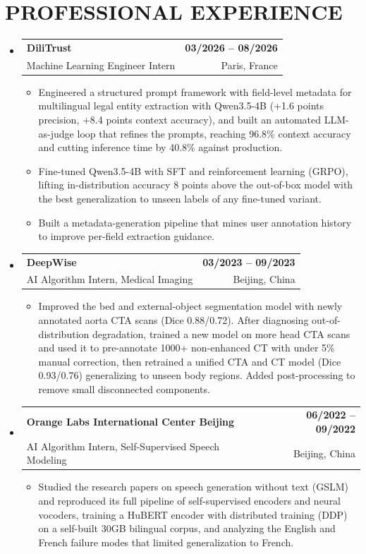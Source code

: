 \documentclass[a4paper,11pt]{article}
\makeatletter
\let\oldsection\section
\renewcommand{\section}[1]{\needspace{5\baselineskip}\oldsection{#1}}
\newcommand{\resumeItem}[1]{
  \item\small{
    {#1\vspace{-1pt}}
  }
}
\newcommand{\resumeSubheading}[4]{
  \vspace{-2pt plus 12pt}\item
    \begin{tabular*}{1.0\textwidth}[t]{l@{\extracolsep{\fill}}r}
      \textbf{#1} & \textbf{#2} \\
      {#3} & \textnormal{#4} \\
    \end{tabular*}\vspace{-7pt}\nopagebreak[4]
}
\newcommand{\resumeSubHeadingListStart}{\begin{itemize}[leftmargin=0.0in, label={}]}
\newcommand{\resumeSubHeadingListEnd}{\end{itemize}}
\newcommand{\resumeItemListStart}{\begin{itemize}}
\newcommand{\resumeItemListEnd}{\end{itemize}\vspace{-5pt}}
\makeatother
\begin{document}
\section{PROFESSIONAL EXPERIENCE}
  \resumeSubHeadingListStart

    \resumeSubheading
      {DiliTrust}{03/2026 -- 08/2026}
      {Machine Learning Engineer Intern}{Paris, France}
      \resumeItemListStart
        \resumeItem{Engineered a structured prompt framework with field-level metadata for multilingual legal entity extraction with Qwen3.5-4B (+1.6 points precision, +8.4 points context accuracy), and built an automated LLM-as-judge loop that refines the prompts, reaching 96.8\% context accuracy and cutting inference time by 40.8\% against production.}
        \resumeItem{Fine-tuned Qwen3.5-4B with SFT and reinforcement learning (GRPO), lifting in-distribution accuracy 8 points above the out-of-box model with the best generalization to unseen labels of any fine-tuned variant.}
        \resumeItem{Built a metadata-generation pipeline that mines user annotation history to improve per-field extraction guidance.}
      \resumeItemListEnd

    \resumeSubheading
      {DeepWise}{03/2023 -- 09/2023}
      {AI Algorithm Intern, Medical Imaging}{Beijing, China}
      \resumeItemListStart
        \resumeItem{Improved the bed and external-object segmentation model with newly annotated aorta CTA scans (Dice 0.88/0.72). After diagnosing out-of-distribution degradation, trained a new model on more head CTA scans and used it to pre-annotate 1000+ non-enhanced CT with under 5\% manual correction, then retrained a unified CTA and CT model (Dice 0.93/0.76) generalizing to unseen body regions. Added post-processing to remove small disconnected components.}
      \resumeItemListEnd

    \resumeSubheading
      {Orange Labs International Center Beijing}{06/2022 -- 09/2022}
      {AI Algorithm Intern, Self-Supervised Speech Modeling}{Beijing, China}
      \resumeItemListStart
        \resumeItem{Studied the research papers on speech generation without text (GSLM) and reproduced its full pipeline of self-supervised encoders and neural vocoders, training a HuBERT encoder with distributed training (DDP) on a self-built 30GB bilingual corpus, and analyzing the English and French failure modes that limited generalization to French.}
      \resumeItemListEnd

  \resumeSubHeadingListEnd

\end{document}
